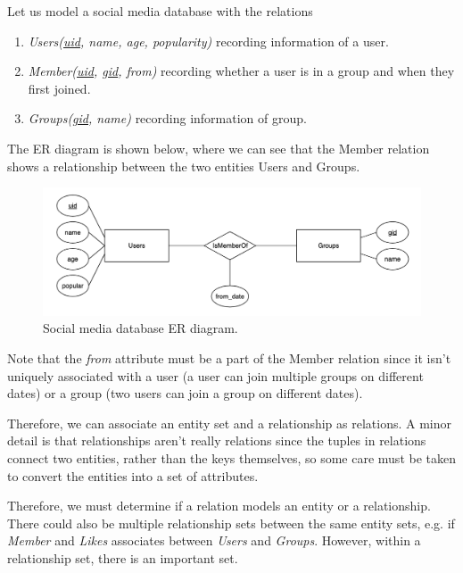 \documentclass{article}
\begin{document}
    \begin{example}[E/R Diagram]
      Let us model a social media database with the relations 
      \begin{enumerate}
        \item \textit{Users(\underline{uid}, name, age, popularity)} recording information of a user. 
        \item \textit{Member(\underline{uid}, \underline{gid}, from)} recording whether a user is in a group and when they first joined. 
        \item \textit{Groups(\underline{gid}, name)} recording information of group. 
      \end{enumerate}
      The ER diagram is shown below, where we can see that the Member relation shows a relationship between the two entities Users and Groups. 

      \begin{figure}[H]
        \centering 
        \includegraphics[scale=0.2]{img/social_media.png}
        \caption{Social media database ER diagram.} 
        \label{fig:social_media}
      \end{figure}

      Note that the \textit{from} attribute must be a part of the Member relation since it isn't uniquely associated with a user (a user can join multiple groups on different dates) or a group (two users can join a group on different dates). 
    \end{example}

    Therefore, we can associate an entity set and a relationship as relations. A minor detail is that relationships aren't really relations since the tuples in relations connect two entities, rather than the keys themselves, so some care must be taken to convert the entities into a set of attributes. 

    Therefore, we must determine if a relation models an entity or a relationship. There could also be multiple relationship sets between the same entity sets, e.g. if \textit{Member} and \textit{Likes} associates between \textit{Users} and \textit{Groups}. However, within a relationship set, there is an important set. 
\end{document}

